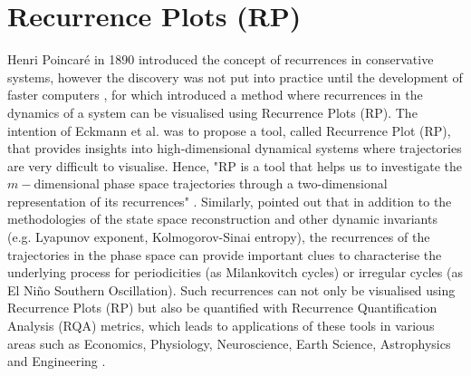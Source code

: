 \section{Recurrence Plots (RP)}
Henri Poincar\'e in 1890 introduced the concept of recurrences in 
conservative systems, however the discovery was not put into practice until 
the development of faster computers \citep{marwan2007}, for which 
\cite{eckmann1987} introduced a method where recurrences in the dynamics of 
a system can be visualised using Recurrence Plots (RP).
The intention of Eckmann et al. \cite{eckmann1987}  was to propose a tool,
called Recurrence Plot (RP), that provides insights into high-dimensional 
dynamical systems where trajectories are very difficult to visualise.
Hence, "RP is a tool that helps us to investigate the 
$m-$dimensional phase space trajectories through a two-dimensional 
representation of its recurrences" \citep[p. 7]{marwan2015}.
Similarly, \cite{marwan2015} pointed out that in addition to the 
methodologies of the state space reconstruction and other dynamic invariants 
(e.g. Lyapunov exponent, Kolmogorov-Sinai entropy), the recurrences of the 
trajectories in the phase space can provide important clues to characterise 
the underlying process for periodicities (as Milankovitch cycles) or 
irregular cycles (as El Ni\~no Southern Oscillation). 
Such recurrences can not only be visualised using Recurrence Plots (RP) 
but also be quantified with Recurrence Quantification Analysis (RQA) metrics, 
which leads to applications of these tools in various areas such as Economics, 
Physiology, Neuroscience, Earth Science, Astrophysics and Engineering 
\citep{marwan2007}.


